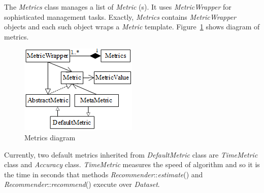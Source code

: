 \documentclass[a4paper,twoside]{article}
\begin{document}
The \textit{Metrics} class manages a list of \textit{Metric} (s). It uses \textit{MetricWrapper} for sophisticated management tasks. Exactly, \textit{Metrics} contains \textit{MetricWrapper} objects and each such object wraps a \textit{Metric} template. Figure~\ref{figure:metrics-diagram} shows diagram of metrics.
\begin{figure}
\centering
\includegraphics{MetricsDiagram.png}
\caption{Metrics diagram}
\label{figure:metrics-diagram}
\end{figure}

Currently, two default metrics inherited from \textit{DefaultMetric} class are \textit{TimeMetric} class and \textit{Accuracy} class. \textit{TimeMetric} measures the speed of algorithm and so it is the time in seconds that methods \textit{Recommender}::\textit{estimate}() and \textit{Recommender}::\textit{recommend}() execute over \textit{Dataset}.
\end{document}
